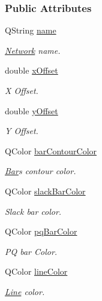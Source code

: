\subsubsection*{Public Attributes}
\begin{DoxyCompactItemize}
\item 
Q\+String \hyperlink{class_network_ab6643733a517f930c60b06f5ffd78186}{name}
\begin{DoxyCompactList}\small\item\em \hyperlink{class_network}{Network} name. \end{DoxyCompactList}\item 
double \hyperlink{class_network_a9f5c70be28a45320802bd0ac3947d114}{x\+Offset}
\begin{DoxyCompactList}\small\item\em X Offset. \end{DoxyCompactList}\item 
double \hyperlink{class_network_a771b16f7eb4459d0ca7141c048b1ab59}{y\+Offset}
\begin{DoxyCompactList}\small\item\em Y Offset. \end{DoxyCompactList}\item 
Q\+Color \hyperlink{class_network_a20c58a0630bdbbade527d55ba48d924c}{bar\+Contour\+Color}
\begin{DoxyCompactList}\small\item\em \hyperlink{class_bar}{Bar}\textquotesingle{}s contour color. \end{DoxyCompactList}\item 
Q\+Color \hyperlink{class_network_ac6c44cb1f88cd67a4fab7eff948e2d1d}{slack\+Bar\+Color}
\begin{DoxyCompactList}\small\item\em Slack bar color. \end{DoxyCompactList}\item 
Q\+Color \hyperlink{class_network_a610c48c9e2dd9555f9b354ab72fb96cc}{pq\+Bar\+Color}
\begin{DoxyCompactList}\small\item\em P\+Q bar Color. \end{DoxyCompactList}\item 
Q\+Color \hyperlink{class_network_a453db7f1a994603fe4d38ac5899eb09c}{line\+Color}
\begin{DoxyCompactList}\small\item\em \hyperlink{class_line}{Line} color. \end{DoxyCompactList}\item 

\end{DoxyCompactItemize}
